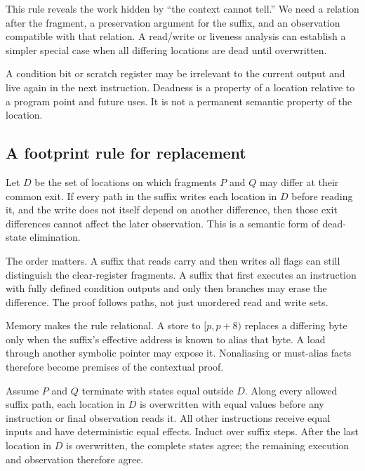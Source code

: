 This rule reveals the work hidden by ``the context cannot tell.'' We need a
relation after the fragment, a preservation argument for the suffix, and an
observation compatible with that relation. A read/write or liveness analysis
can establish a simpler special case when all differing locations are dead
until overwritten.

\begin{warning}[title={Dead at one point does not mean absent from the state}]
A condition bit or scratch register may be irrelevant to the current output
and live again in the next instruction. Deadness is a property of a location
relative to a program point and future uses. It is not a permanent semantic
property of the location.
\end{warning}

\subsection{A footprint rule for replacement}

Let \(D\) be the set of locations on which fragments \(P\) and \(Q\) may
differ at their common exit. If every path in the suffix writes each location
in \(D\) before reading it, and the write does not itself depend
on another difference, then those exit differences cannot affect the later
observation. This is a semantic form of dead-state elimination.

The order matters. A suffix that reads carry and then writes all flags can
still distinguish the clear-register fragments. A suffix that first executes
an instruction with fully defined condition outputs and only then branches may
erase the difference. The proof follows paths, not just unordered read and
write sets.

Memory makes the rule relational. A store to \([p,p+8)\) replaces a differing
byte only when the suffix's effective address is known to alias that byte. A
load through another symbolic pointer may expose it. Nonaliasing or must-alias
facts therefore become premises of the contextual proof.

\begin{proofkit}[title={Overwrite-before-read replacement rule}]
Assume \(P\) and \(Q\) terminate with states equal outside \(D\). Along every
allowed suffix path, each location in \(D\) is overwritten with equal values
before any instruction or final observation reads it. All other instructions
receive equal inputs and have deterministic equal effects. Induct over suffix
steps. After the last location in \(D\) is overwritten, the complete states
agree; the remaining execution and observation therefore agree.
\end{proofkit}

